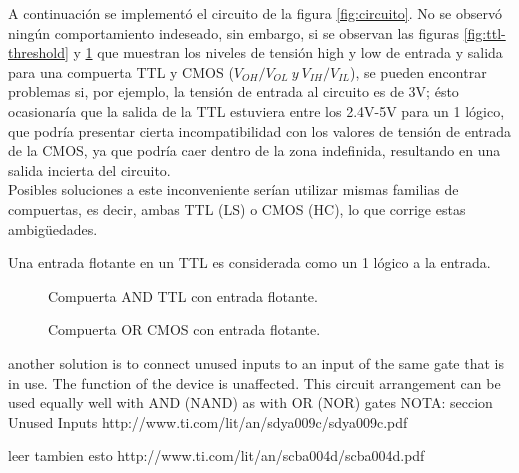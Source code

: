 A continuación se implementó el circuito de la figura \ref{fig:circuito}. No se observó ningún comportamiento indeseado, 
sin embargo, si se observan las figuras \ref{fig:ttl-threshold} y \ref{fig:cmos-threshold} que muestran los niveles de tensión high y low de entrada y salida 
para una compuerta TTL y CMOS ($V_{OH}/V_{OL}~y~V_{IH}/V_{IL}$), se pueden encontrar problemas si, por ejemplo, 
la tensión de entrada al circuito es de 3V; ésto ocasionaría que la salida de la TTL estuviera entre los 2.4V-5V para un 1 lógico, 
que podría presentar cierta incompatibilidad con los valores de tensión de entrada de la CMOS, ya que podría caer dentro de la zona indefinida, 
resultando en una salida incierta del circuito.\\
Posibles soluciones a este inconveniente serían utilizar mismas familias de compuertas, es decir, ambas TTL (LS) o CMOS (HC), lo que corrige estas ambigüedades.



Una entrada flotante en un TTL es considerada como un 1 lógico a la entrada.


\begin{figure}[H]
    \begin{minipage}{.49\linewidth}
        \centering
        \caption{Compuerta AND TTL con entrada flotante.}
        \label{fig:ttl-threshold}
    \end{minipage}
    \begin{minipage}{.5\linewidth}
        \centering
        \caption{Compuerta OR CMOS con entrada flotante.}
        \label{fig:cmos-threshold}
    \end{minipage}
\end{figure}


another solution is to connect unused inputs to an input of the same gate that is in use. The function of the device
is unaffected. This circuit arrangement can be used equally well with AND (NAND) as with OR (NOR) gates 
NOTA: seccion Unused Inputs http://www.ti.com/lit/an/sdya009c/sdya009c.pdf

leer tambien esto http://www.ti.com/lit/an/scba004d/scba004d.pdf

